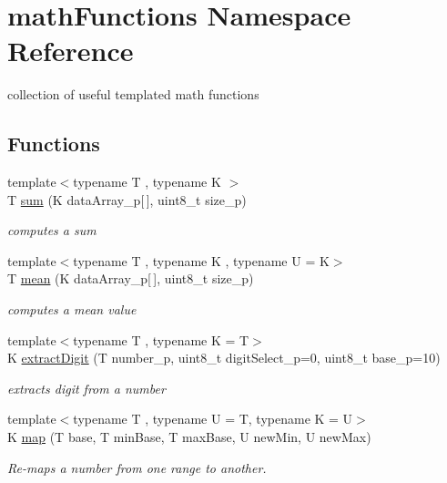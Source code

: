 \hypertarget{namespacemath_functions}{}\section{math\+Functions Namespace Reference}
\label{namespacemath_functions}


collection of useful templated math functions  


\subsection*{Functions}
\begin{DoxyCompactItemize}
\item 
{\footnotesize template$<$typename T , typename K $>$ }\\T \hyperlink{namespacemath_functions_addb45716cc0631d67e6cb6a913336491}{sum} (K data\+Array\+\_\+p\mbox{[}$\,$\mbox{]}, uint8\+\_\+t size\+\_\+p)
\begin{DoxyCompactList}\small\item\em computes a sum \end{DoxyCompactList}\item 
{\footnotesize template$<$typename T , typename K , typename U  = K$>$ }\\T \hyperlink{namespacemath_functions_a5b9bc0e0bf8f4e65a9177b8274c594ef}{mean} (K data\+Array\+\_\+p\mbox{[}$\,$\mbox{]}, uint8\+\_\+t size\+\_\+p)
\begin{DoxyCompactList}\small\item\em computes a mean value \end{DoxyCompactList}\item 
{\footnotesize template$<$typename T , typename K  = T$>$ }\\K \hyperlink{namespacemath_functions_a32a0226ce7d0593d33c203874e28397e}{extract\+Digit} (T number\+\_\+p, uint8\+\_\+t digit\+Select\+\_\+p=0, uint8\+\_\+t base\+\_\+p=10)
\begin{DoxyCompactList}\small\item\em extracts digit from a number \end{DoxyCompactList}\item 
{\footnotesize template$<$typename T , typename U  = T, typename K  = U$>$ }\\K \hyperlink{namespacemath_functions_a65a3e03a8f5216b86440247de2023aae}{map} (T base, T min\+Base, T max\+Base, U new\+Min, U new\+Max)
\begin{DoxyCompactList}\small\item\em Re-\/maps a number from one range to another. \end{DoxyCompactList}\end{DoxyCompactItemize}


